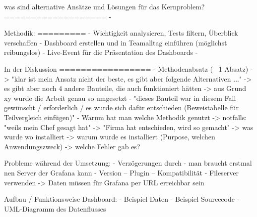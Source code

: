 was sind alternative Ansätze und Lösungen für das Kernproblem?
===================
- 

Methodik:
=========
- Wichtigkeit analysieren, Tests filtern, Überblick verschaffen
- Dashboard erstellen und in Teamalltag einführen (möglichst reibungslos)
- Live-Event für die Präsentation des Dashboards
- 

In der Diskussion
=================
- Methodenabsatz (~ 1 Absatz)
 -> "klar ist mein Ansatz nicht der beste, es gibt aber folgende Alternativen ..."
 -> es gibt aber noch 4 andere Bauteile, die auch funktioniert hätten
 -> aus Grund xy wurde die Arbeit genau so umgesetzt - "dieses Bauteil war in diesem Fall gewünscht / erforderlich / es wurde sich dafür entschieden (Beweistabelle für Teilvergleich einfügen)"
- Warum hat man welche Methodik genutzt
 -> notfalls: "weils mein Chef gesagt hat" -> "Firma hat entschieden, wird so gemacht"
 -> was wurde wo installiert
 -> warum wurde es installiert (Purpose, welchen Anwendungszweck)
 -> welche Fehler gab es?

Probleme während der Umsetzung: - Verzögerungen durch
- man braucht erstmal nen Server der Grafana kann 
- Version – Plugin – Kompatibilität
- Fileserver verwenden
-> Daten müssen für Grafana per URL erreichbar sein

Aufbau / Funktionsweise Dashboard:
- Beispiel Daten
- Beispiel Sourcecode
- UML-Diagramm des Datenflusses